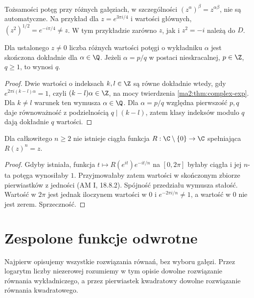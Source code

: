 \begin{uwaga}
Tożsamości potęg przy różnych gałęziach, w szczególności
$(z^\alpha)^\beta=z^{\alpha\beta}$, nie są automatyczne.
Na przykład dla $z=e^{3\pi i/4}$ i wartości głównych,
$(z^2)^{1/2}=e^{-i\pi/4}\ne z$. W tym przykładzie zarówno
$z$, jak i $z^2=-i$ należą do $D$.
\end{uwaga}

\begin{wniosek}
\label{ma2:cor:power-values}
Dla ustalonego $z\ne0$ liczba różnych wartości potęgi
o wykładniku $\alpha$ jest skończona dokładnie dla
$\alpha\in\Q$. Jeżeli $\alpha=p/q$ w postaci nieskracalnej,
$p\in\Z$, $q\ge1$, to wynosi $q$.
\end{wniosek}
\begin{proof}
Dwie wartości o indeksach $k,l\in\Z$ są równe dokładnie wtedy,
gdy $e^{2\pi i(k-l)\alpha}=1$, czyli $(k-l)\alpha\in\Z$,
na mocy twierdzenia \ref{ma2:thm:complex-exp}.
Dla $k\ne l$ warunek ten wymusza $\alpha\in\Q$.
Dla $\alpha=p/q$ względna pierwszość $p,q$ daje
równoważność z podzielnością $q\mid(k-l)$, zatem klasy
indeksów modulo $q$ dają dokładnie $q$ wartości.
\end{proof}

\begin{twierdzenie}
\label{ma2:thm:no-global-root}
Dla całkowitego $n\ge2$ nie istnieje ciągła funkcja
$R:\C\setminus\{0\}\to\C$ spełniająca $R(z)^n=z$.
\end{twierdzenie}
\begin{proof}
Gdyby istniała, funkcja
$t\mapsto R(e^{it})e^{-it/n}$ na $[0,2\pi]$
byłaby ciągła i jej $n$-ta potęga wynosiłaby $1$.
Przyjmowałaby zatem wartości w skończonym zbiorze
pierwiastków z jedności (AM I, 18.8.2).
Spójność przedziału wymusza stałość. Wartość w $2\pi$
jest jednak iloczynem wartości w $0$ i $e^{-2\pi i/n}\ne1$,
a wartość w $0$ nie jest zerem. Sprzeczność.
\end{proof}

\section{Zespolone funkcje odwrotne}

Najpierw opisujemy wszystkie rozwiązania równań, bez
wyboru gałęzi. Przez logarytm liczby niezerowej rozumiemy
w tym opisie dowolne rozwiązanie równania wykładniczego,
a przez pierwiastek kwadratowy dowolne rozwiązanie równania
kwadratowego.

